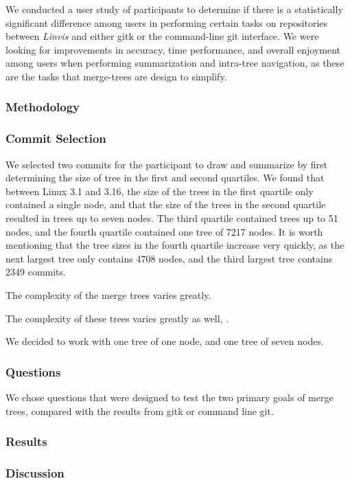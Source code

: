 We conducted a user study of  participants to determine if there is a
statistically significant difference among users in performing certain tasks on
repositories between \textit{Linvis} and either gitk or the command-line git
interface. We were looking for improvements in accuracy, time performance, and
overall enjoyment among users when performing summarization and intra-tree
navigation, as these are the tasks that merge-trees are design to simplify.



\subsubsection{Methodology}
\label{ssub:methodology}

\subsubsection{Commit Selection}
\label{ssub:commit_selection}

We selected two commits for the participant to draw and summarize by first
determining the size of tree in the first and second quartiles. We found that
between Linux 3.1 and 3.16, the size of the trees in the first quartile only
contained a single node, and that the size of the trees in the second quartile
resulted in trees up to seven nodes. The third quartile contained trees up to 51
nodes, and the fourth quartile contained one tree of 7217 nodes. It is worth
mentioning that the tree sizes in the fourth quartile increase very quickly, as the
next largest tree only contains 4708 nodes, and the third largest tree contains 2349
commits.

The complexity of the merge trees varies greatly.

The complexity of these trees varies greatly as well, . %



We decided to work with one tree of one node, and one tree of seven nodes.

\subsubsection{Questions}
\label{ssub:questions}

We chose questions that were designed to test the two primary goals of merge trees,
compared with the results from gitk or command line git. 

\subsubsection{Results}
\label{ssub:results}

\subsubsection{Discussion}
\label{ssub:discussion}

